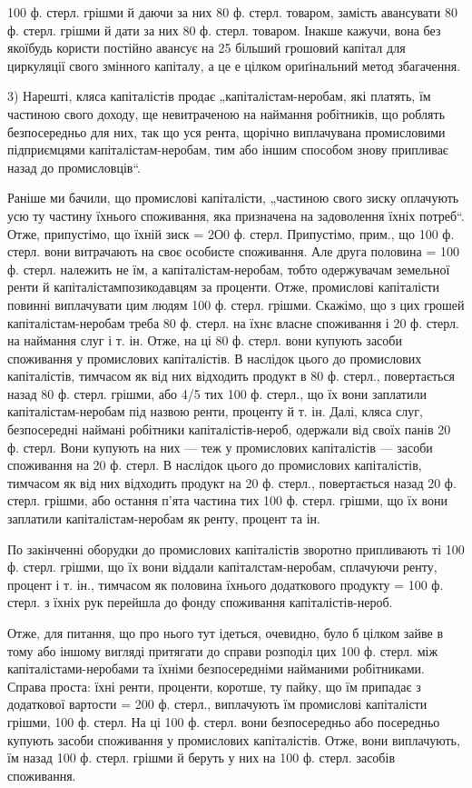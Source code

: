 100 ф. стерл. грішми й даючи за них 80 ф. стерл. товаром, замість авансувати 80 ф. стерл. грішми й
дати за них 80 ф. стерл. товаром. Інакше кажучи, вона без якоїбудь користи постійно авансує на 25%
більший грошовий капітал для циркуляції свого змінного капіталу, а це е цілком ориґінальний метод
збагачення.

3) Нарешті, кляса капіталістів продає „капіталістам-неробам, які платять, їм частиною свого доходу,
ще невитраченою на наймання робітників, що роблять безпосередньо для них, так що уся рента, щорічно
виплачувана промисловими підприємцями капіталістам-неробам, тим або іншим способом знову припливає
назад до промисловців“.

Раніше ми бачили, що промислові капіталісти, „частиною свого зиску оплачують усю ту частину їхнього
споживання, яка призначена на задоволення їхніх потреб“. Отже, припустімо, що їхній зиск = 2О0 ф.
стерл. Припустімо, прим., що 100 ф. стерл. вони витрачають на своє особисте споживання. Але друга
половина = 100 ф. стерл. належить не їм, а капіталістам-неробам, тобто одержувачам земельної ренти й
капіталістампозикодавцям
за проценти. Отже, промислові капіталісти повинні виплачувати цим людям 100 ф. стерл. грішми.
Скажімо, що з цих грошей капіталістам-неробам треба 80 ф. стерл. на їхнє власне споживання і 20 ф.
стерл. на наймання слуг і т. ін. Отже, на ці 80 ф. стерл. вони купують засоби споживання у
промислових капіталістів. В наслідок цього до промислових капіталістів, тимчасом як від них
відходить продукт в 80 ф. стерл., повертається назад 80 ф. стерл. грішми, або 4/5 тих 100 ф. стерл.,
що їх вони заплатили капіталістам-неробам під назвою ренти, проценту й т. ін. Далі, кляса слуг,
безпосередні наймані робітники капіталістів-нероб, одержали від своїх панів 20 ф. стерл. Вони
купують на них — теж у промислових капіталістів — засоби споживання на 20 ф. стерл. В наслідок цього
до промислових капіталістів, тимчасом як від них відходить продукт на 20 ф. стерл., повертається
назад 20 ф. стерл. грішми, або остання п’ята частина тих 100 ф. стерл. грішми, що їх вони заплатили
капіталістам-неробам як ренту, процент та ін.

По закінченні оборудки до промислових капіталістів зворотно припливають ті 100 ф. стерл. грішми, що
їх вони віддали капіталстам-неробам, сплачуючи ренту, процент і т. ін., тимчасом як половина їхнього
додаткового продукту = 100 ф. стерл. з їхніх рук перейшла до фонду споживання капіталістів-нероб.

Отже, для питання, що про нього тут ідеться, очевидно, було б цілком зайве в тому або іншому вигляді
притягати до справи розподіл цих 100 ф. стерл. між капіталістами-неробами та їхніми безпосередніми
найманими робітниками. Справа проста: їхні ренти, проценти, коротше, ту пайку, що їм припадає з
додаткової вартости = 200 ф. стерл., виплачують їм промислові капіталісти грішми, 100 ф. стерл. На
ці 100 ф. стерл. вони безпосередньо або посередньо купують засоби споживання у промислових
капіталістів. Отже, вони виплачують, їм назад 100 ф. стерл. грішми й беруть у них на 100 ф. стерл.
засобів споживання.
